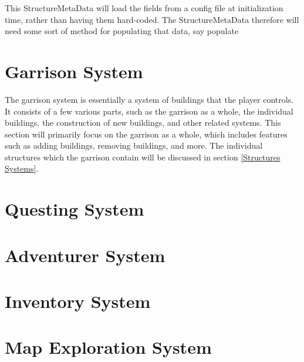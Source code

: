 This StructureMetaData will load the fields from a config file at initialization time, rather than having them hard-coded. The StructureMetaData therefore will need some sort of method for populating that data, say populate






\section{Garrison System}

The garrison system is essentially a system of buildings that the player controls. It consists of a few various parts, such as the garrison as a whole, the individual buildings, the construction of new buildings, and other related systems. This section will primarily focus on the garrison as a whole, which includes features such as adding buildings, removing buildings, and more. The individual structures which the garrison contain will be discussed in section \ref{Structures Systems}.














\section{Questing System}









\section{Adventurer System}










\section{Inventory System}












\section{Map Exploration System}

















